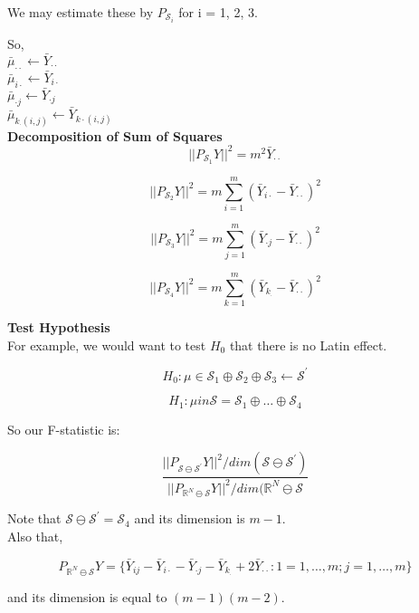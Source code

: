 \documentclass[11pt,fleqn]{book} %
\begin{document}
We may estimate these by $P_{\mathcal{S}_i }$ for i = 1, 2, 3. 

So,\\ 

$\bar{\mu}_{\cdot \cdot} \leftarrow \bar{Y}_{\cdot \cdot}$\\
$\bar{\mu}_{i \cdot} \leftarrow \bar{Y}_{i \cdot}$\\
$\bar{\mu}_{\cdot j} \leftarrow \bar{Y}_{\cdot j}$\\
$\bar{\mu}_{k_\cdot(i,j)} \leftarrow \bar{Y}_{k\cdot(i,j)}$\\

\textbf{Decomposition of Sum of Squares}\\

		$$|| P_{\mathcal{S}_1} Y ||^2 = m^2 \bar{Y}_{\cdot \cdot} $$

		$$|| P_{\mathcal{S}_2} Y ||^2 = m \sum^m_{i=1} (\bar{Y}_{i \cdot} - \bar{Y}_{\cdot \cdot})^2 $$

		$$|| P_{\mathcal{S}_3} Y ||^2 = m \sum^m_{j=1} (\bar{Y}_{\cdot j} - \bar{Y}_{\cdot \cdot})^2 $$

		$$|| P_{\mathcal{S}_4} Y ||^2 = m \sum^m_{k=1} (\bar{Y}_{k_\cdot} - \bar{Y}_{\cdot \cdot})^2 $$


\textbf{Test Hypothesis}\\

For example, we would want to test $H_0$ that there is no Latin effect. 

		$$H_0: \mu \in \mathcal{S}_1 \oplus \mathcal{S}_2 \oplus \mathcal{S}_3 \leftarrow \mathcal{S}^\prime $$

		$$H_1: \mu in \mathcal{S} = \mathcal{S}_1 \oplus \dots \oplus \mathcal{S}_4 $$

So our F-statistic is:

		$$\frac{|| P_{\mathcal{S} \ominus \mathcal{S}^\prime} Y ||^2 / dim( \mathcal{S} \ominus \mathcal{S}^\prime)}{|| P_{\mathbb{R}^N \ominus \mathcal{S}} Y ||^2 / dim(\mathbb{R}^N \ominus \mathcal{S}} $$


Note that $\mathcal{S} \ominus \mathcal{S}^\prime = \mathcal{S}_4$ and its dimension is $m - 1$. \\

Also that, 

		$$ P_{\mathbb{R}^N \ominus \mathcal{S}} Y = \{\bar{Y}_{ij} - \bar{Y}_{i\cdot} - \bar{Y}_{\cdot j} - \bar{Y}_{k_\cdot} + 2 \bar{Y}_{\cdot \cdot}: 1 = 1, \dots, m; j= 1, \dots, m\}$$

and its dimension is equal to $(m-1)(m-2)$.\\
\end{document}
